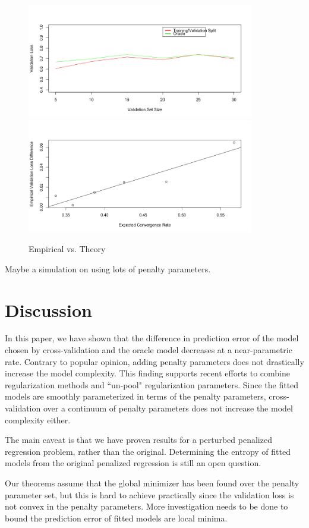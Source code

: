 \documentclass[12pt]{article}
\begin{document}
\begin{figure}
\label{fig:emp_v_theory}
\caption{Empirical vs. Theory}
\centering
\includegraphics[height=50mm]{../R/figures/validation_size_loss.png}
\includegraphics[height=50mm]{../R/figures/qqplot.png}
\end{figure}

Maybe a simulation on using lots of penalty parameters.

\section{Discussion}\label{sec:discussion}

In this paper, we have shown that the difference in prediction error of the model chosen by cross-validation and the oracle model decreases at a near-parametric rate. Contrary to popular opinion, adding penalty parameters does not drastically increase the model complexity. This finding supports recent efforts to combine regularization methods and ``un-pool" regularization parameters. Since the fitted models are smoothly parameterized in terms of the penalty parameters, cross-validation over a continuum of penalty parameters does not increase the model complexity either.

The main caveat is that we have proven results for a perturbed penalized regression problem, rather than the original. Determining the entropy of fitted models from the original penalized regression is still an open question.

Our theorems assume that the global minimizer has been found over the penalty parameter set, but this is hard to achieve practically since the validation loss is not convex in the penalty parameters. More investigation needs to be done to bound the prediction error of fitted models are local minima.
\end{document}
